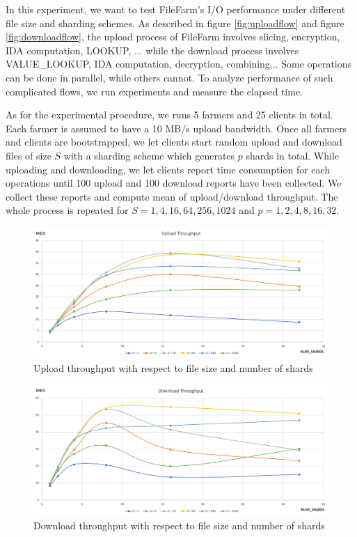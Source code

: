 In this experiment, we want to test FileFarm's I/O performance under different file size and sharding schemes. As described in figure \ref{fig:uploadflow} and figure \ref{fig:downloadflow}, the upload process of FileFarm involves slicing, encryption, IDA computation, LOOKUP, ... while the download process involves VALUE\_LOOKUP, IDA computation, decryption, combining... Some operations can be done in parallel, while others cannot. To analyze performance of such complicated flows, we run experiments and measure the elapsed time.

As for the experimental procedure, we runs 5 farmers and 25 clients in total. Each farmer is assumed to have a 10 MB/s upload bandwidth. Once all farmers and clients are bootstrapped, we let clients start random upload and download files of size $S$ with a sharding scheme which generates $p$ shards in total. While uploading and downloading, we let clients report time consumption for each operations until 100 upload and 100 download reports have been collected. We collect these reports and compute mean of upload/download throughput. The whole process is repeated for $S=1,4,16,64,256,1024$ and $p=1,2,4,8,16,32$.

\begin{figure}[hbt]
\centering
  \includegraphics[width=14cm]{charts/chart_upload_throughput.png}
  \caption{Upload throughput with respect to file size and number of shards}
  \label{fig:uploadthroughput}
\end{figure}

\begin{figure}[hbt]
\centering
  \includegraphics[width=14cm]{charts/chart_download_throughput.png}
  \caption{Download throughput with respect to file size and number of shards}
  \label{fig:downloadthroughput}
\end{figure}

